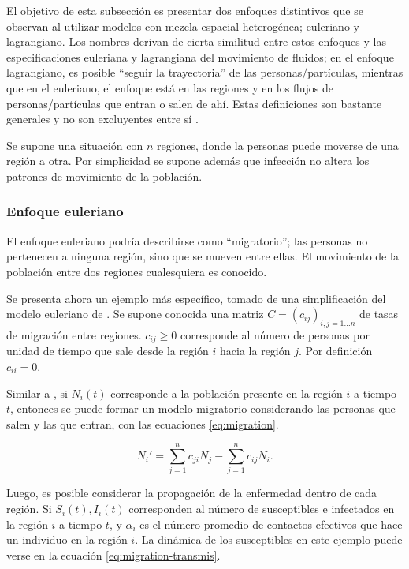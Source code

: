 El objetivo de esta subsección es presentar dos enfoques distintivos que se observan al utilizar modelos con mezcla espacial heterogénea; euleriano y lagrangiano. Los nombres derivan de cierta similitud entre estos enfoques y las especificaciones euleriana y lagrangiana del movimiento de fluidos; en el enfoque lagrangiano, es posible ``seguir la trayectoria'' de las personas/partículas, mientras que en el euleriano, el enfoque está en las regiones y en los flujos de personas/partículas que entran o salen de ahí. Estas definiciones son bastante generales y no son excluyentes entre sí \cite{Cosner2009}.

Se supone una situación con \(n\) regiones, donde la personas puede moverse de una región a otra. Por simplicidad se supone además que infección no altera los patrones de movimiento de la población.\\


\subsubsection*{Enfoque euleriano}

El enfoque euleriano podría describirse como ``migratorio''; las personas no pertenecen a ninguna región, sino que se mueven entre ellas. El movimiento de la población entre dos regiones cualesquiera es conocido.

Se presenta ahora un ejemplo más específico, tomado de una simplificación del modelo euleriano de \cite{Hsieh2007}. Se supone conocida una matriz \(C = (c_{ij})_{i, j = 1\dots n}\) de tasas de migración entre regiones.  \(c_{ij} \geq 0\) corresponde al número de personas por unidad de tiempo que sale desde la región \(i\) hacia la región \(j\). Por definición \(c_{ii} = 0\). 


Similar a \cite{Cosner2009}, si \(N_i(t)\) corresponde a la población presente en la región \(i\) a tiempo \(t\), entonces se puede formar un modelo migratorio considerando las personas que salen y las que entran, con las ecuaciones \ref{eq:migration}.

\begin{equation}\label{eq:migration}
N_i' = \sum_{j = 1}^n c_{ji} N_j - \sum_{j = 1}^n c_{ij} N_i.
\end{equation}

Luego, es posible considerar la propagación de la enfermedad dentro de cada región. Si \(S_{i}(t), I_i(t)\) corresponden al número de susceptibles e infectados en la región \(i\) a tiempo \(t\), y \(\alpha_{i}\) es el número promedio de contactos efectivos que hace un individuo en la región \(i\). La dinámica de los susceptibles en este ejemplo puede verse en la ecuación \ref{eq:migration-transmis}.

